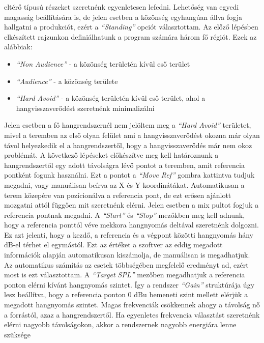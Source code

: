 eltérő típusú részeket szeretnénk egyenletesen lefedni. Lehetőség van egyedi magasság beállítására is,
de jelen esetben a közönség egyhangúan állva fogja hallgatni a produkciót, ezért a \textit{``Standing''} opciót választottam.
Az előző lépésben elkészített rajzunkon definiálhatunk a program számára három fő régiót.
\newline Ezek az alábbiak:
\begin{itemize}
	\item \textit{``Non Audience''} - a közönség területén kívül eső terület
	\item \textit{``Audience''} - a közönség területe
	\item \textit{``Hard Avoid''} - a közönség területén kívül eső terület, ahol a hangvisszaverődést szeretnénk minimalizálni
\end{itemize}
Jelen esetben a fő hangrendszernél nem jelöltem meg a \textit{``Hard Avoid''} területet, mivel a teremben az első olyan felület
ami a hangvisszaverődést okozna már olyan távol helyezkedik el a hangrendszertől, hogy a hangvisszaverődés már nem okoz problémát.
A következő lépéseket előkészítve meg kell határoznunk a hangrendszertől egy adott távolságra lévő pontot a teremben,
amit referencia pontként fogunk használni. Ezt a pontot a \textit{``Move Ref''} gombra kattintva tudjuk megadni,
vagy manuálisan beírva az X és Y koordinátákat. Automatikusan a terem közepére van pozícionálva a referencia pont, de
ezt erősen ajánlott mozgatni attól függően mit szeretnénk elérni. Jelen esetben a mix pultot fogjuk a referencia pontnak megadni.
A \textit{``Start''} és \textit{``Stop''} mezőkben meg kell adnunk, hogy a referencia ponttól véve mekkora hangnyomás
deltával szeretnénk dolgozni. Ez azt jelenti, hogy a kezdő, a referencia és a végpont közötti hangnyomás hány dB-el térhet el egymástól.
Ezt az értéket a szoftver az eddig megadott információk alapján automatikusan kiszámolja, de manuálisan is megadhatjuk.
Az automatikus számítás az esetek többségében megfelelő eredményt ad, ezért most is ezt választottam.
A \textit{``Target SPL''} mezőben megadhatjuk a referencia ponton elérni kívánt hangnyomás szintet.
Így a rendszer \textit{``Gain''} struktúrája úgy lesz beállítva, hogy a referencia ponton 0 dBu bemeneti szint mellett elérjük a megadott hangnyomás szintet.
Magas frekvenciák csökkennek ahogy a távolság nő a forrástól, azaz a hangrendszertől.
Ha egyenletes frekvencia választást szeretnénk elérni nagyobb távolságokon, akkor a rendszernek nagyobb energiára lenne szüksége
